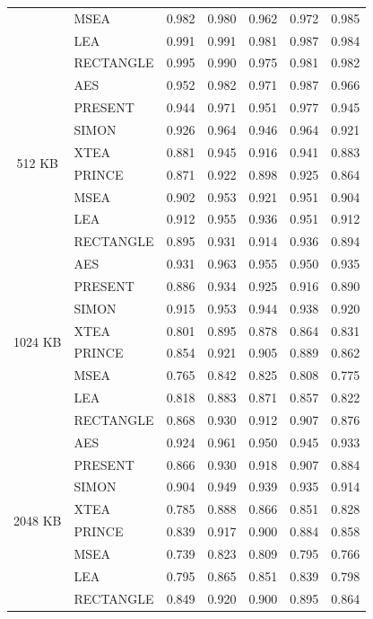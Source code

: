 \documentclass[12pt]{article}
\begin{document}
\begin{table}[p]
{\begin{tabular}{|c|l|c|c|c|c|c|}
& MSEA       & 0.982 & 0.980 & 0.962 & 0.972 & 0.985 \\
& LEA        & 0.991 & 0.991 & 0.981 & 0.987 & 0.984 \\
& RECTANGLE  & 0.995 & 0.990 & 0.975 & 0.981 & 0.982 \\
\hline
\multirow{8}{*}{512 KB}
& AES        & 0.952 & 0.982 & 0.971 & 0.987 & 0.966 \\
& PRESENT    & 0.944 & 0.971 & 0.951 & 0.977 & 0.945 \\
& SIMON      & 0.926 & 0.964 & 0.946 & 0.964 & 0.921 \\
& XTEA       & 0.881 & 0.945 & 0.916 & 0.941 & 0.883 \\
& PRINCE     & 0.871 & 0.922 & 0.898 & 0.925 & 0.864 \\
& MSEA       & 0.902 & 0.953 & 0.921 & 0.951 & 0.904 \\
& LEA        & 0.912 & 0.955 & 0.936 & 0.951 & 0.912 \\
& RECTANGLE  & 0.895 & 0.931 & 0.914 & 0.936 & 0.894 \\
\hline
\multirow{8}{*}{1024 KB}
& AES        & 0.931 & 0.963 & 0.955 & 0.950 & 0.935 \\
& PRESENT    & 0.886 & 0.934 & 0.925 & 0.916 & 0.890 \\
& SIMON      & 0.915 & 0.953 & 0.944 & 0.938 & 0.920 \\
& XTEA       & 0.801 & 0.895 & 0.878 & 0.864 & 0.831 \\
& PRINCE     & 0.854 & 0.921 & 0.905 & 0.889 & 0.862 \\
& MSEA       & 0.765 & 0.842 & 0.825 & 0.808 & 0.775 \\
& LEA        & 0.818 & 0.883 & 0.871 & 0.857 & 0.822 \\
& RECTANGLE  & 0.868 & 0.930 & 0.912 & 0.907 & 0.876 \\
\hline
\multirow{8}{*}{2048 KB}
& AES        & 0.924 & 0.961 & 0.950 & 0.945 & 0.933 \\
& PRESENT    & 0.866 & 0.930 & 0.918 & 0.907 & 0.884 \\
& SIMON      & 0.904 & 0.949 & 0.939 & 0.935 & 0.914 \\
& XTEA       & 0.785 & 0.888 & 0.866 & 0.851 & 0.828 \\
& PRINCE     & 0.839 & 0.917 & 0.900 & 0.884 & 0.858 \\
& MSEA       & 0.739 & 0.823 & 0.809 & 0.795 & 0.766 \\
& LEA        & 0.795 & 0.865 & 0.851 & 0.839 & 0.798 \\
& RECTANGLE  & 0.849 & 0.920 & 0.900 & 0.895 & 0.864 \\
\hline
\end{tabular}%
}
\end{table}
\end{document}
